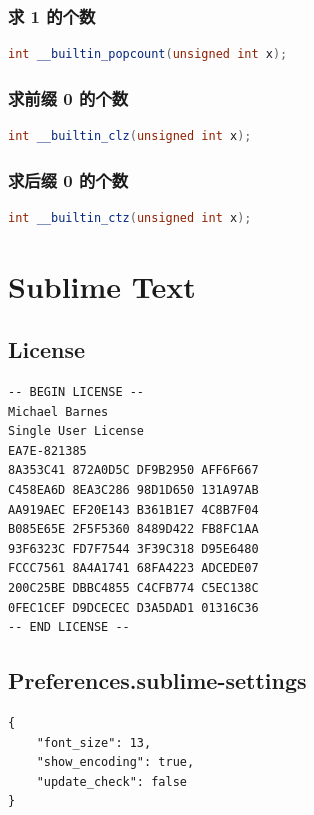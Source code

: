 \documentclass{article}
\begin{document}
\subsubsection{求 1 的个数}

\begin{lstlisting}[language=C++]
int __builtin_popcount(unsigned int x);
\end{lstlisting}

\subsubsection{求前缀 0 的个数}

\begin{lstlisting}[language=C++]
int __builtin_clz(unsigned int x);
\end{lstlisting}

\subsubsection{求后缀 0 的个数}

\begin{lstlisting}[language=C++]
int __builtin_ctz(unsigned int x);
\end{lstlisting}

\section{Sublime Text}

\subsection{License}

\begin{lstlisting}
-- BEGIN LICENSE --
Michael Barnes
Single User License
EA7E-821385
8A353C41 872A0D5C DF9B2950 AFF6F667
C458EA6D 8EA3C286 98D1D650 131A97AB
AA919AEC EF20E143 B361B1E7 4C8B7F04
B085E65E 2F5F5360 8489D422 FB8FC1AA
93F6323C FD7F7544 3F39C318 D95E6480
FCCC7561 8A4A1741 68FA4223 ADCEDE07
200C25BE DBBC4855 C4CFB774 C5EC138C
0FEC1CEF D9DCECEC D3A5DAD1 01316C36
-- END LICENSE --
\end{lstlisting}

\subsection{Preferences.sublime-settings}

\begin{lstlisting}
{
	"font_size": 13, 
	"show_encoding": true,
	"update_check": false
}
\end{lstlisting}
\end{document}
